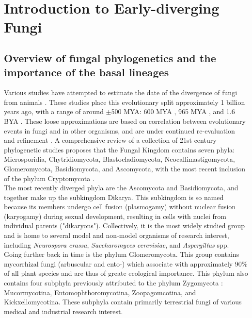 \chapter{Introduction to Early-diverging Fungi}
\section{Overview of fungal phylogenetics and the importance of the basal lineages}
Various studies have attempted to estimate the date of the divergence of fungi from animals \cite{Taylor2006}. These studies place this evolutionary split approximately 1 billion years ago, with a range of around $\pm$500 MYA: 600 MYA \cite{Berbee1993}, 965 MYA \cite{doolittle1996}, and 1.6 BYA \cite{Wang1999}. These loose approximations are based on correlation between evolutionary events in fungi and in other organisms, and are under continued re-evaluation and refinement \cite{Berbee2010}.
\indent A comprehensive review of a collection of 21st century phylogenetic studies \cite{Hibbett2007} proposes that the Fungal Kingdom contains seven phyla: Microsporidia, Chytridiomycota, Blastocladiomycota, Neocallimastigomycota, Glomeromycota, Basidiomycota, and Ascomycota, with the most recent inclusion of the phylum Cryptomycota \cite{Jones2011}.\\
\indent The most recently diverged phyla are the Ascomycota and Basidiomycota, and together make up the subkingdom Dikarya. This subkingdom is so named because its members undergo cell fusion (plasmogamy) without nuclear fusion (karyogamy) during sexual development, resulting in cells with nuclei from individual parents ("dikaryons"). Collectively, it is the most widely studied group and is home to several model and non-model organisms of research interest, including \textit{Neurospora crassa}, \textit{Saccharomyces cerevisiae}, and \textit{Aspergillus} spp.\\
\indent Going further back in time is the phylum Glomeromycota. This group contains mycorrhizal fungi (arbuscular and ento-) which associate with approximately 90\% of all plant species and are thus of greate ecological importance. This phylum also contains four subphyla previously attributed to the phylum Zygomycota \cite{White2006}: Mucormycotina, Entomophthoromycotina, Zoopagomcotina, and Kickxellomycotina. These subphyla contain primarily terrestrial fungi of various medical and industrial research interest.\\ 
